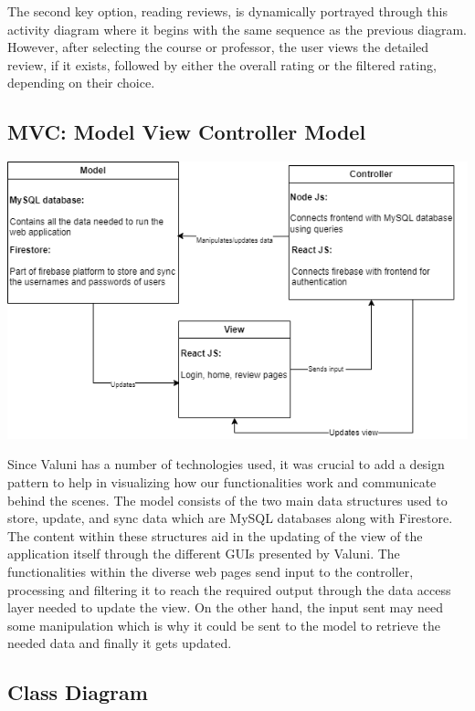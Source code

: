 \documentclass{article}
\begin{document}
\quad The second key option, reading reviews, is dynamically portrayed through this activity diagram where it begins with the same sequence as the previous diagram. However, after selecting the course or professor, the user views the detailed review, if it exists, followed by either the overall rating or the filtered rating, depending on their choice.


\subsection{MVC: Model View Controller Model} 

\begin{center} 
  \includegraphics[scale=0.65]{../Diagrams/MVC.png}
\end{center}

\quad Since Valuni has a number of technologies used, it was crucial to add a design pattern to help in visualizing how our functionalities work and communicate behind the scenes. The model consists of the two main data structures used to store, update, and sync data which are MySQL databases along with Firestore. The content within these structures aid in the updating of the view of the application itself through the different GUIs presented by Valuni. The functionalities within the diverse web pages send input to the controller, processing and filtering it to reach the required output through the data access layer needed to update the view. On the other hand, the input sent may need some manipulation which is why it could be sent to the model to retrieve the needed data and finally it gets updated. 

\subsection{Class Diagram}  
\end{document}

